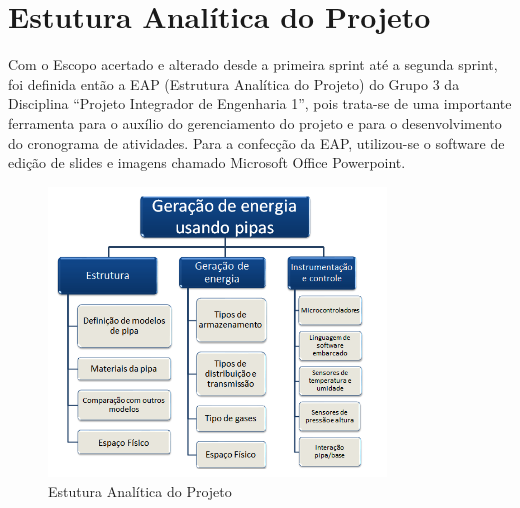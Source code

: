 \chapter[Estutura Analítica do Projeto]{Estutura Analítica do Projeto}

Com o Escopo acertado e alterado desde a primeira sprint até a segunda sprint, foi definida então a EAP (Estrutura Analítica do Projeto) do Grupo 3 da Disciplina “Projeto Integrador de Engenharia 1”, pois trata-se de uma importante ferramenta para o auxílio do gerenciamento do projeto e para o desenvolvimento do cronograma de atividades. Para a confecção da EAP, utilizou-se o software de edição de slides e imagens chamado Microsoft Office Powerpoint.

\begin{figure}[p]
	\centering
    \includegraphics[width=0.8\textwidth]{figuras/eap.png}
    \caption{Estutura Analítica do Projeto}
    \label{fig:eap}
\end{figure} 